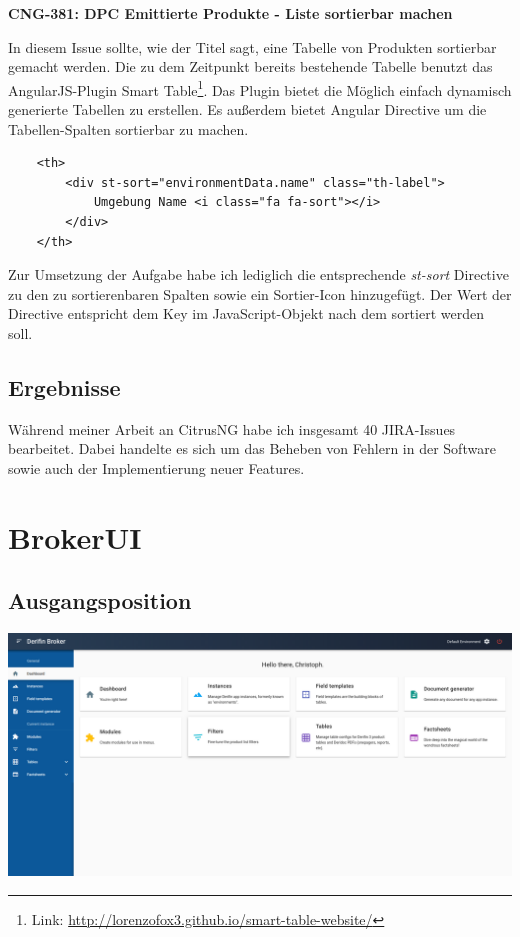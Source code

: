 \documentclass[chapterprefix=false, 12pt, a4paper, oneside, parskip=half, listof=totoc, bibliography=totoc, numbers=noendperiod]{scrbook}
\begin{document}
    \textbf{CNG-381: DPC Emittierte Produkte - Liste sortierbar machen}

    In diesem Issue sollte, wie der Titel sagt, eine Tabelle von Produkten sortierbar gemacht werden.
    Die zu dem Zeitpunkt bereits bestehende Tabelle benutzt das AngularJS-Plugin Smart Table\footnote{Link: \url{http://lorenzofox3.github.io/smart-table-website/}}.
    Das Plugin bietet die Möglich einfach dynamisch generierte Tabellen zu erstellen. Es außerdem bietet Angular Directive um die Tabellen-Spalten sortierbar zu machen.

    \begin{verbatim}
    <th>
        <div st-sort="environmentData.name" class="th-label">
            Umgebung Name <i class="fa fa-sort"></i>
        </div>
    </th>
    \end{verbatim}

    Zur Umsetzung der Aufgabe habe ich lediglich die entsprechende \textit{st-sort} Directive zu den zu sortierenbaren Spalten sowie ein Sortier-Icon hinzugefügt.
    Der Wert der Directive entspricht dem Key im JavaScript-Objekt nach dem sortiert werden soll.

    \subsection{Ergebnisse}

    Während meiner Arbeit an CitrusNG habe ich insgesamt 40 JIRA-Issues bearbeitet. Dabei handelte
    es sich um das Beheben von Fehlern in der Software sowie auch der Implementierung neuer Features.

    \section{BrokerUI}

    \subsection{Ausgangsposition}

    \includegraphics[width=1.00\textwidth]{img/broker-ui-neu.png}
\end{document}
